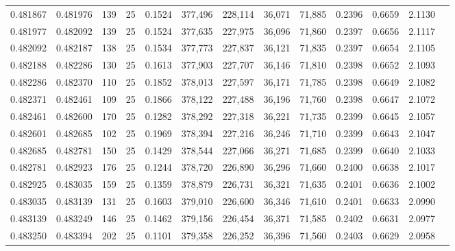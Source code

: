 \begin{tabular}{rrrrrrrrrrrrr}
0.481867 & 0.481976 &   139 &  25 &                                     0.1524 & 377,496 & 228,114 &  36,071 &  71,885 & 0.2396 & 0.6659 & 2.1130 \\
0.481977 & 0.482092 &   139 &  25 &                                     0.1524 & 377,635 & 227,975 &  36,096 &  71,860 & 0.2397 & 0.6656 & 2.1117 \\
0.482092 & 0.482187 &   138 &  25 &                                     0.1534 & 377,773 & 227,837 &  36,121 &  71,835 & 0.2397 & 0.6654 & 2.1105 \\
0.482188 & 0.482286 &   130 &  25 &                                     0.1613 & 377,903 & 227,707 &  36,146 &  71,810 & 0.2398 & 0.6652 & 2.1093 \\
0.482286 & 0.482370 &   110 &  25 &                                     0.1852 & 378,013 & 227,597 &  36,171 &  71,785 & 0.2398 & 0.6649 & 2.1082 \\
0.482371 & 0.482461 &   109 &  25 &                                     0.1866 & 378,122 & 227,488 &  36,196 &  71,760 & 0.2398 & 0.6647 & 2.1072 \\
0.482461 & 0.482600 &   170 &  25 &                                     0.1282 & 378,292 & 227,318 &  36,221 &  71,735 & 0.2399 & 0.6645 & 2.1057 \\
0.482601 & 0.482685 &   102 &  25 &                                     0.1969 & 378,394 & 227,216 &  36,246 &  71,710 & 0.2399 & 0.6643 & 2.1047 \\
0.482685 & 0.482781 &   150 &  25 &                                     0.1429 & 378,544 & 227,066 &  36,271 &  71,685 & 0.2399 & 0.6640 & 2.1033 \\
0.482781 & 0.482923 &   176 &  25 &                                     0.1244 & 378,720 & 226,890 &  36,296 &  71,660 & 0.2400 & 0.6638 & 2.1017 \\
0.482925 & 0.483035 &   159 &  25 &                                     0.1359 & 378,879 & 226,731 &  36,321 &  71,635 & 0.2401 & 0.6636 & 2.1002 \\
0.483035 & 0.483139 &   131 &  25 &                                     0.1603 & 379,010 & 226,600 &  36,346 &  71,610 & 0.2401 & 0.6633 & 2.0990 \\
0.483139 & 0.483249 &   146 &  25 &                                     0.1462 & 379,156 & 226,454 &  36,371 &  71,585 & 0.2402 & 0.6631 & 2.0977 \\
0.483250 & 0.483394 &   202 &  25 &                                     0.1101 & 379,358 & 226,252 &  36,396 &  71,560 & 0.2403 & 0.6629 & 2.0958 \\

\end{tabular}
